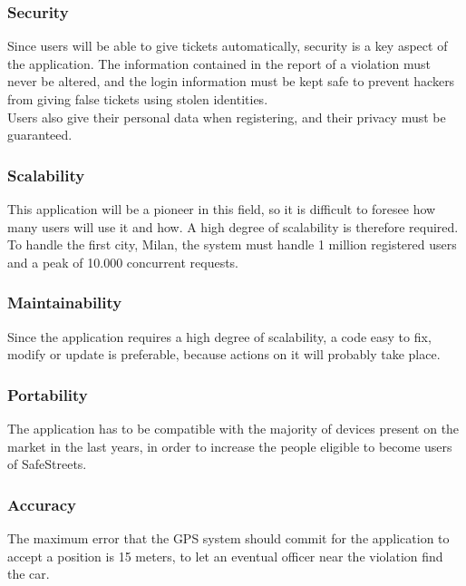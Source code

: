 \subsubsection{Security}
    Since users will be able to give tickets automatically, security is a key aspect of the application.
    The information contained in the report of a violation must never be altered, and the login information
    must be kept safe to prevent hackers from giving false tickets using stolen identities.\\
  	Users also give their personal data when registering, and their privacy must be guaranteed.

\subsubsection{Scalability}
    This application will be a pioneer in this field, so it is difficult to foresee how many users will
    use it and how. A high degree of scalability is therefore required. To handle the first city, Milan,
    the system must handle 1 million registered users and a peak of 10.000 concurrent requests.
    
\subsubsection{Maintainability}
	Since the application requires a high degree of scalability, a code easy to fix, modify or update is preferable,
	because actions on it will probably take place.    
	
\subsubsection{Portability}
	The application has to be compatible with the majority of devices present on the market in the last years, in order to
	increase the people eligible to become users of SafeStreets.
	
\subsubsection{Accuracy}
    The maximum error that the GPS system should commit for the application to accept a position is 15 meters,
    to let an eventual officer near the violation find the car.
